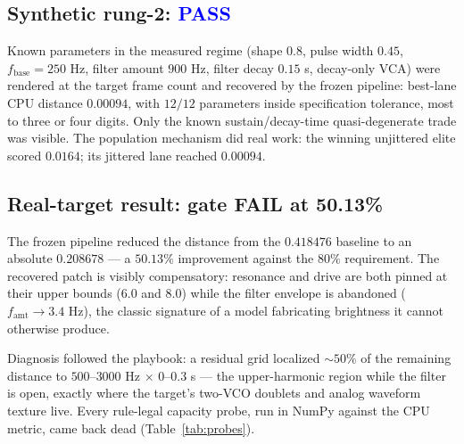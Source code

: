 \documentclass[10pt]{article}
\newcommand{\pass}{\textcolor{blue}{\textbf{PASS}}}
\newcommand{\fail}{\textcolor{warn}{\textbf{FAIL}}}
\begin{document}
\subsection{Synthetic rung-2: \pass}

Known parameters in the measured regime (shape $0.8$, pulse width $0.45$, $f_{\mathrm{base}}=250$ Hz, filter amount $900$ Hz, filter decay $0.15$ s, decay-only VCA) were rendered at the target frame count and recovered by the frozen pipeline: best-lane CPU distance $\mathbf{0.00094}$, with $12/12$ parameters inside specification tolerance, most to three or four digits. Only the known sustain/decay-time quasi-degenerate trade was visible. The population mechanism did real work: the winning unjittered elite scored $0.0164$; its jittered lane reached $0.00094$.

\subsection{Real-target result: gate \fail{} at 50.13\%}

The frozen pipeline reduced the distance from the $0.418476$ baseline to an absolute $\mathbf{0.208678}$ --- a $50.13\%$ improvement against the $80\%$ requirement. The recovered patch is visibly compensatory: resonance and drive are both pinned at their upper bounds ($6.0$ and $8.0$) while the filter envelope is abandoned ($f_{\mathrm{amt}} \to 3.4$ Hz), the classic signature of a model fabricating brightness it cannot otherwise produce.

Diagnosis followed the playbook: a residual grid localized $\sim$$50\%$ of the remaining distance to $500$--$3000$ Hz $\times$ $0$--$0.3$ s --- the upper-harmonic region while the filter is open, exactly where the target's two-VCO doublets and analog waveform texture live. Every rule-legal capacity probe, run in NumPy against the CPU metric, came back dead (Table~\ref{tab:probes}).
\end{document}
